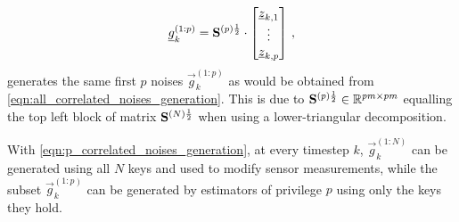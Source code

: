 \documentclass[letterpaper, 10 pt, conference]{ieeeconf}
\begin{document}
\begin{equation}\label{eqn:p_correlated_noises_generation}
  {\underline{g}}_k^{(1:p)}=
  {{\mathbf{S}}}^{(p)\frac{1}{2}}\cdot
  \begin{bmatrix}
    {\underline{z}}_{k,1}\\
    \vdots\\
    {\underline{z}}_{k,p}
  \end{bmatrix}\,,
\end{equation}
generates the same first $p$ noises $\vec{g}_k^{(1:p)}$ as would be obtained from \eqref{eqn:all_correlated_noises_generation}. This is due to ${{\mathbf{S}}}^{(p)\frac{1}{2}}\in\mathbb{R}^{pm\times pm}$ equalling the top left block of matrix ${{\mathbf{S}}}^{(N)\frac{1}{2}}$ when using a lower-triangular decomposition.

With \eqref{eqn:p_correlated_noises_generation}, at every timestep $k$, $\vec{g}_k^{(1:N)}$ can be generated using all $N$ keys and used to modify sensor measurements, while the subset $\vec{g}_k^{(1:p)}$ can be generated by estimators of privilege $p$ using only the keys they hold.

% 
% 
\end{document}
